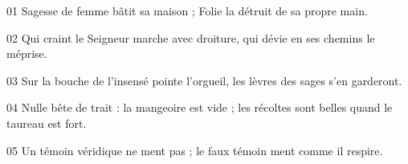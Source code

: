 01 Sagesse de femme bâtit sa maison ; Folie la détruit de sa propre main.

02 Qui craint le Seigneur marche avec droiture, qui dévie en ses chemins le méprise.

03 Sur la bouche de l’insensé pointe l’orgueil, les lèvres des sages s’en garderont.

04 Nulle bête de trait : la mangeoire est vide ; les récoltes sont belles quand le taureau est fort.

05 Un témoin véridique ne ment pas ; le faux témoin ment comme il respire.
